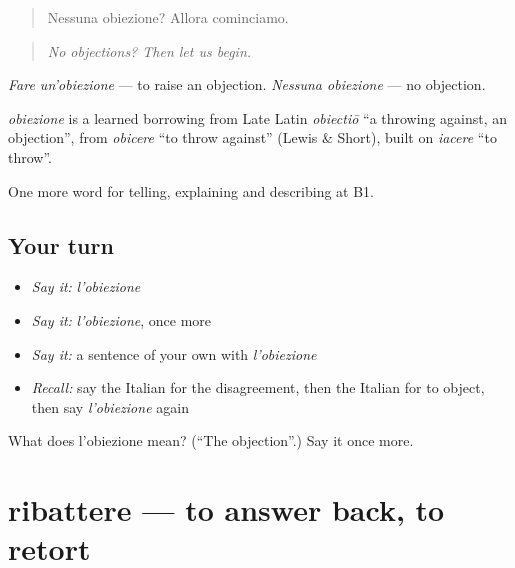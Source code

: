 \begin{quote}
Nessuna obiezione? Allora cominciamo.
\end{quote}

\begin{quote}
\emph{No objections? Then let us begin.}
\end{quote}

\emph{Fare un'obiezione} — to raise an objection. \emph{Nessuna obiezione} — no objection.

\begin{cousinweb}
\emph{obiezione} is a learned borrowing from Late Latin \emph{obiectiō} \textquotedblleft{}a throwing against, an objection\textquotedblright{}, from \emph{obicere} \textquotedblleft{}to throw against\textquotedblright{} (Lewis \& Short), built on \emph{iacere} \textquotedblleft{}to throw\textquotedblright{}.
\end{cousinweb}

\begin{grammarlens}[title={What you've built}]
One more word for telling, explaining and describing at B1.
\end{grammarlens}

\subsection*{Your turn}
\begin{itemize}
\raggedright
  \item \emph{Say it:} \emph{l'obiezione}
  \item \emph{Say it:} \emph{l'obiezione}, once more
  \item \emph{Say it:} a sentence of your own with \emph{l'obiezione}
  \item \emph{Recall:} say the Italian for the disagreement, then the Italian for to object, then say \emph{l'obiezione} again
\end{itemize}

\begin{tcolorbox}[breakable,colback=teal!4,colframe=teal!35!black,title={Before you move on}]
What does l'obiezione mean? (\textquotedblleft{}The objection\textquotedblright{}.) Say it once more.
\end{tcolorbox}
\section[ribattere]{ribattere — to answer back, to retort}

\label{lesson:IT-C341-ribattere}



